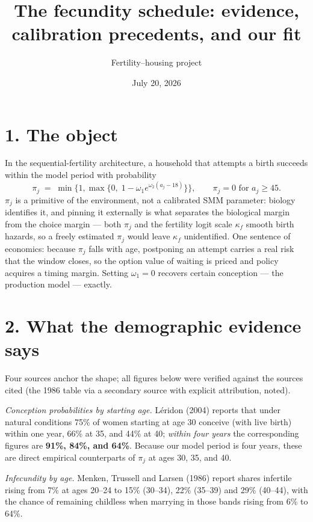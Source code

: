 \documentclass[11pt]{article}
\title{\vspace{-1.4em}\textbf{The fecundity schedule: evidence, calibration precedents, and our fit}}
\author{Fertility--housing project}
\date{July 20, 2026}
\begin{document}
\maketitle
\vspace{-1.4em}

\section*{1. The object}

In the sequential-fertility architecture, a household that attempts a birth
succeeds within the model period with probability
\[
\pi_j \;=\; \min\bigl\{1,\max\{0,\;1-\omega_1 e^{\omega_2 (a_j-18)}\}\bigr\},
\qquad \pi_j = 0 \text{ for } a_j \ge 45 .
\]
$\pi_j$ is a primitive of the environment, not a calibrated SMM parameter:
biology identifies it, and pinning it externally is what separates the
biological margin from the choice margin --- both $\pi_j$ and the fertility
logit scale $\kappa_f$ smooth birth hazards, so a freely estimated $\pi_j$
would leave $\kappa_f$ unidentified. One sentence of economics: because
$\pi_j$ falls with age, postponing an attempt carries a real risk that the
window closes, so the option value of waiting is priced and policy acquires
a timing margin. Setting $\omega_1=0$ recovers certain conception --- the
production model --- exactly.

\section*{2. What the demographic evidence says}

Four sources anchor the shape; all figures below were verified against the
sources cited (the 1986 table via a secondary source with explicit
attribution, noted).

\emph{Conception probabilities by starting age.} L\'eridon (2004) reports
that under natural conditions 75\% of women starting at age 30 conceive
(with live birth) within one year, 66\% at 35, and 44\% at 40; \emph{within
four years} the corresponding figures are \textbf{91\%, 84\%, and 64\%}.
Because our model period is four years, these are direct empirical
counterparts of $\pi_j$ at ages 30, 35, and 40.

\emph{Infecundity by age.} Menken, Trussell and Larsen (1986) report shares
infertile rising from 7\% at ages 20--24 to 15\% (30--34), 22\% (35--39) and
29\% (40--44), with the chance of remaining childless when marrying in those
bands rising from 6\% to 64\%.
\end{document}
